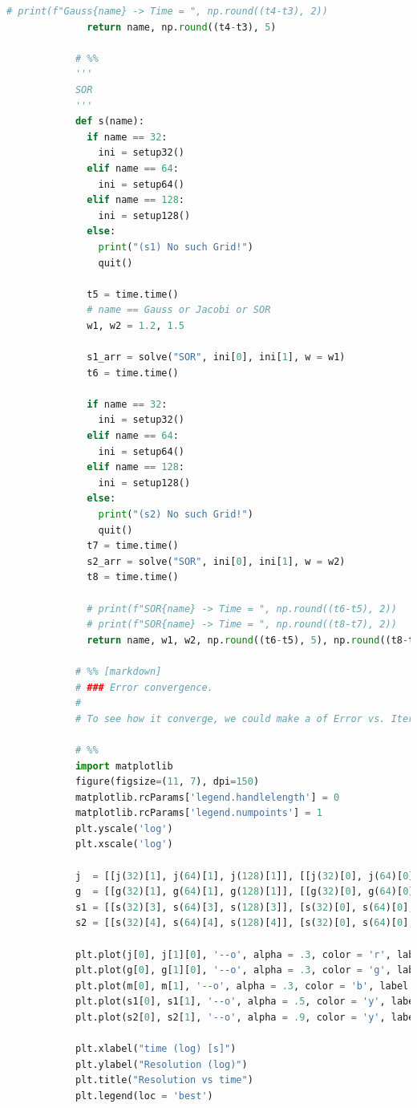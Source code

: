 \documentclass[12pt]{article}
\begin{document}
\begin{lstlisting}[language={Python}]
              # print(f"Gauss{name} -> Time = ", np.round((t4-t3), 2))
              return name, np.round((t4-t3), 5)
            
            # %%
            '''
            SOR
            '''
            def s(name):
              if name == 32:
                ini = setup32()
              elif name == 64:
                ini = setup64()
              elif name == 128:
                ini = setup128()
              else:
                print("(s1) No such Grid!")
                quit()
                
              t5 = time.time()
              # name == Gauss or Jacobi or SOR
              w1, w2 = 1.2, 1.5
            
              s1_arr = solve("SOR", ini[0], ini[1], w = w1)
              t6 = time.time()
            
              if name == 32:
                ini = setup32()
              elif name == 64:
                ini = setup64()
              elif name == 128:
                ini = setup128()
              else:
                print("(s2) No such Grid!")
                quit()
              t7 = time.time()
              s2_arr = solve("SOR", ini[0], ini[1], w = w2)
              t8 = time.time()
              
              # print(f"SOR{name} -> Time = ", np.round((t6-t5), 2))
              # print(f"SOR{name} -> Time = ", np.round((t8-t7), 2))
              return name, w1, w2, np.round((t6-t5), 5), np.round((t8-t7), 5)
            
            # %% [markdown]
            # ### Error convergence.
            # 
            # To see how it converge, we could make a of Error vs. Iteration times to see how it converges.
            
            # %%
            import matplotlib
            figure(figsize=(11, 7), dpi=150)
            matplotlib.rcParams['legend.handlelength'] = 0
            matplotlib.rcParams['legend.numpoints'] = 1
            plt.yscale('log')
            plt.xscale('log')
            
            j  = [[j(32)[1], j(64)[1], j(128)[1]], [[j(32)[0], j(64)[0], j(128)[0]]]]
            g  = [[g(32)[1], g(64)[1], g(128)[1]], [[g(32)[0], g(64)[0], g(128)[0]]]]
            s1 = [[s(32)[3], s(64)[3], s(128)[3]], [s(32)[0], s(64)[0], s(128)[0]]]
            s2 = [[s(32)[4], s(64)[4], s(128)[4]], [s(32)[0], s(64)[0], s(128)[0]]]
            
            plt.plot(j[0], j[1][0], '--o', alpha = .3, color = 'r', label = "Jacobi")
            plt.plot(g[0], g[1][0], '--o', alpha = .3, color = 'g', label = "Gauss-Seidel")
            plt.plot(m[0], m[1], '--o', alpha = .3, color = 'b', label = "Sparse Matrix")
            plt.plot(s1[0], s1[1], '--o', alpha = .5, color = 'y', label = f"SOR, w = {s(32)[1]}")
            plt.plot(s2[0], s2[1], '--o', alpha = .9, color = 'y', label = f"SOR, w = {s(32)[2]}")
            
            plt.xlabel("time (log) [s]")
            plt.ylabel("Resolution (log)")
            plt.title("Resolution vs time")
            plt.legend(loc = 'best')            
        \end{lstlisting}
\end{document}
